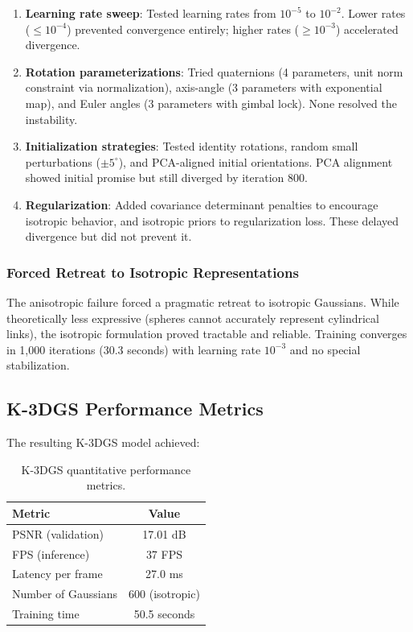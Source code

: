 ﻿\documentclass[12pt,a4paper,oneside]{report}
\begin{document}
\begin{enumerate}
    \item \textbf{Learning rate sweep}: Tested learning rates from $10^{-5}$ to $10^{-2}$. Lower rates ($\leq 10^{-4}$) prevented convergence entirely; higher rates ($\geq 10^{-3}$) accelerated divergence.
    \item \textbf{Rotation parameterizations}: Tried quaternions (4 parameters, unit norm constraint via normalization), axis-angle (3 parameters with exponential map), and Euler angles (3 parameters with gimbal lock). None resolved the instability.
    \item \textbf{Initialization strategies}: Tested identity rotations, random small perturbations ($\pm5^\circ$), and PCA-aligned initial orientations. PCA alignment showed initial promise but still diverged by iteration 800.
    \item \textbf{Regularization}: Added covariance determinant penalties to encourage isotropic behavior, and isotropic priors to regularization loss. These delayed divergence but did not prevent it.
\end{enumerate}

\subsubsection{Forced Retreat to Isotropic Representations}

The anisotropic failure forced a pragmatic retreat to isotropic Gaussians. While theoretically less expressive (spheres cannot accurately represent cylindrical links), the isotropic formulation proved tractable and reliable. Training converges in 1,000 iterations (30.3 seconds) with learning rate $10^{-3}$ and no special stabilization.

\subsection{K-3DGS Performance Metrics}

The resulting K-3DGS model achieved:

\begin{table}[H]
\centering
\caption{K-3DGS quantitative performance metrics.}
\label{tab:k3dgs_performance}
\begin{tabular}{lc}
\toprule
Metric & Value \\
\midrule
PSNR (validation) & 17.01 dB \\
FPS (inference) & 37 FPS \\
Latency per frame & 27.0 ms \\
Number of Gaussians & 600 (isotropic) \\
Training time & 50.5 seconds \\
\bottomrule
\end{tabular}
\end{table}
\end{document}
